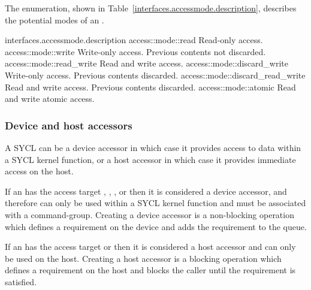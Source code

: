 The  enumeration, shown in Table~\ref{interfaces.accessmode.description}, describes the potential modes of an .



{interfaces.accessmode.description}
 \addRow
    {access::mode::read}
    {%
      Read-only access.
    }
  \addRow
    {access::mode::write}
    {%
     Write-only access.
     Previous contents not discarded.
    }
  \addRow
    {access::mode::read_write}
    {%
      Read and write access.
    }
  \addRow
    {access::mode::discard_write}
    {%
      Write-only access.
      Previous contents discarded.
    }
  \addRow
    {access::mode::discard_read_write}
    {%
      Read and write access.
      Previous contents discarded.
    }
  \addRow
    {access::mode::atomic}
    {%
      Read and write atomic access.
    }
\completeTable


\subsubsection{Device and host accessors}

A SYCL  can be a device accessor in which case it provides
access to data within a SYCL kernel function, or a host accessor in which case
it provides immediate access on the host.

If an  has the access target , ,
,  or
 then it is considered a device
accessor, and therefore can only be used within a SYCL kernel function and must
be associated with a \gls{command-group}. Creating a device accessor is a
non-blocking operation which defines a requirement on the device and adds the
requirement to the queue.

If an  has the access target  or  then it
is considered a host accessor and can only be used on the \gls{host}. Creating a
host accessor is a blocking operation which defines a requirement on the host
and blocks the caller until the requirement is satisfied.

